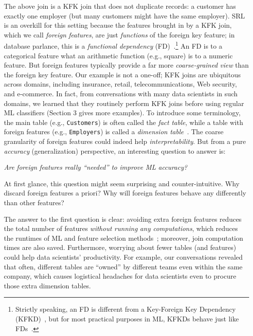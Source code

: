 The above join is a KFK join that does not duplicate records: a customer has exactly one employer (but many customers might have the same employer).
SRL is an overkill for this setting because the features brought in by a KFK join, which we call \textit{foreign features}, are just \textit{functions} of 
the foreign key feature; in database parlance, this is a \textit{functional dependency} (FD)~\cite{cowbook}.\footnote{Strictly speaking, an FD is different 
from a Key-Foreign Key Dependency (KFKD)~\cite{dbtheorybook}, but for most practical purposes in ML, KFKDs behave just like FDs~\cite{hamlet}.} 
An FD is to a categorical feature what an arithmetic function (e.g., square) is to a numeric feature. But foreign features typically provide a far more 
\textit{coarse-grained view} than the foreign key feature.
Our example is not a one-off; KFK joins are ubiquitous across domains, including insurance, retail, telecommunications, Web security, 
and e-commerce. In fact, from conversations with many data scientists in such domains, we learned that they routinely perform KFK joins before using 
regular ML classifiers (Section 3 gives more examples). To introduce some terminology, the main table (e.g., \texttt{Customers}) is often called the 
\textit{fact table}, while a table with foreign features (e.g., \texttt{Employers}) is called a \textit{dimension table}~\cite{cowbook}.
%
The coarse granularity of foreign features could indeed help \textit{interpretability}. But from a pure \textit{accuracy} (generalization) perspective, 
an interesting question to answer is: 

\begin{center}\textit{Are foreign features really ``needed'' to improve ML accuracy?}\end{center}

At first glance, this question might seem surprising and counter-intuitive. Why discard foreign features a priori? Why will foreign features 
behave any differently than other features? 

The answer to the first question is clear: avoiding extra foreign features reduces the total number of features \textit{without running any computations}, 
which reduces the runtimes of ML and feature selection methods~\cite{guyon}; moreover, join computation times are also saved. 
Furthermore, worrying about fewer tables (and features) could help data scientists' productivity. For example, our conversations revealed that often, different tables 
are ``owned'' by different teams even within the same company, which causes logistical headaches for data scientists even to procure those extra dimension tables.

